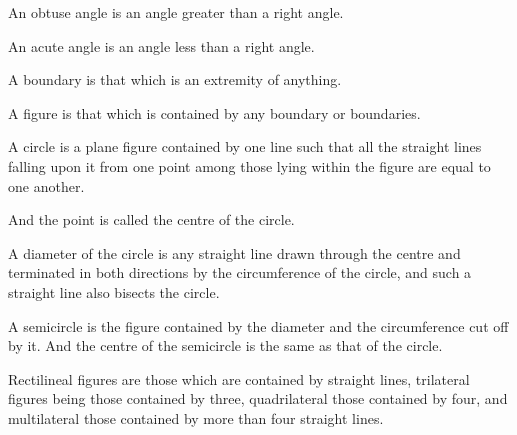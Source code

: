 \documentclass{rrxiv}
\begin{document}
\begin{scope}
\label{def:I.11}
An obtuse angle is an angle greater than a right angle.
\end{scope}

\begin{scope}
\label{def:I.12}
An acute angle is an angle less than a right angle.
\end{scope}

\begin{scope}
\label{def:I.13}
A boundary is that which is an extremity of anything.
\end{scope}

\begin{scope}
\label{def:I.14}
A figure is that which is contained by any boundary or boundaries.
\end{scope}

\begin{scope}
\label{def:I.15}
A circle is a plane figure contained by one line such that all the
straight lines falling upon it from one point among those lying within
the figure are equal to one another.
\end{scope}

\begin{scope}
\label{def:I.16}
And the point is called the centre of the circle.
\end{scope}

\begin{scope}
\label{def:I.17}
A diameter of the circle is any straight line drawn through the centre
and terminated in both directions by the circumference of the circle,
and such a straight line also bisects the circle.
\end{scope}

\begin{scope}
\label{def:I.18}
A semicircle is the figure contained by the diameter and the
circumference cut off by it. And the centre of the semicircle is the
same as that of the circle.
\end{scope}

\begin{scope}
\label{def:I.19}
Rectilineal figures are those which are contained by straight lines,
trilateral figures being those contained by three, quadrilateral those
contained by four, and multilateral those contained by more than four
straight lines.
\end{scope}
\end{document}
